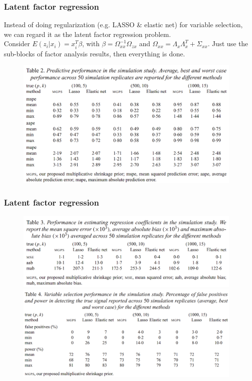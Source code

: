 \documentclass{beamer}
\begin{document}
	\begin{frame}
		\frametitle{Latent factor regression}
		Instead of doing regularization (e.g. LASSO \& elastic net) for variable selection, we can regard it as the latent factor regression problem.\\
		Consider $E(z_i|x_i) = x_i^T\beta$, with $\beta = \Omega_{xx}^{-1}\Omega_{zx}$ and $\Omega_{xx} = \Lambda_x\Lambda_x^T + \Sigma_{xx}$. Just use the sub-blocks of factor analysis results, then everything is done. 
		\begin{figure}
			\includegraphics[width=0.8\linewidth]{image005.png}
		\end{figure}
	\end{frame}
	
	\begin{frame}
		\frametitle{Latent factor regression}
		\begin{figure}
			\includegraphics[width=0.8\linewidth]{image006.png}
			\includegraphics[width=0.8\linewidth]{image007.png}
		\end{figure}
	\end{frame}
	
\end{document}
